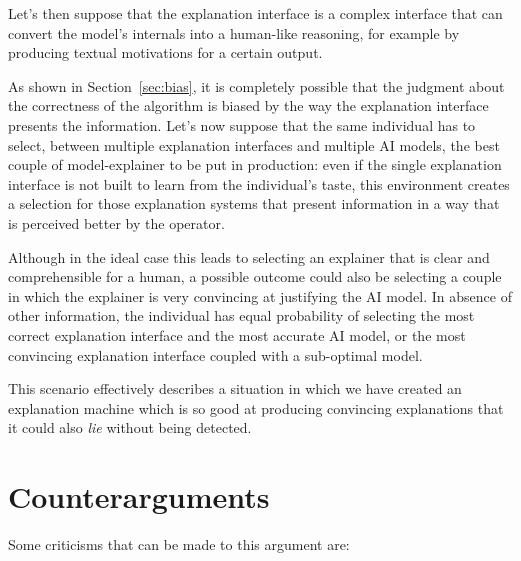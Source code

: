 \documentclass[conference]{IEEEtran}
\begin{document}
Let's then suppose that the explanation interface is a complex interface that
can convert the model's internals into a human-like reasoning, for example by
producing textual motivations for a certain output.

As shown in Section~\ref{sec:bias}, it is completely possible that the judgment
about the correctness of the algorithm is biased by the way the explanation
interface presents the information. Let's now suppose that the same individual
has to select,  between multiple explanation interfaces and multiple AI models,
the best couple of model-explainer to be put in production: even if the single
explanation interface is not built to learn from the individual's taste, this
environment creates a selection for those explanation systems that present
information in a way that is perceived better by the operator.

Although in the ideal case this leads to selecting an explainer that is clear
and comprehensible for a human, a possible outcome could also be selecting a
couple in which the explainer is very convincing at justifying the AI model. In
absence of other information, the individual has equal probability of selecting
the most correct explanation interface and the most accurate AI model, or the
most convincing explanation interface coupled with a sub-optimal model.

This scenario effectively describes a situation in which we have created an
explanation machine which is so good at producing convincing explanations that
it could also \textit{lie} without being detected.


\section{Counterarguments}
\label{sec:counterarg}


Some criticisms that can be made to this argument are:
\end{document}
